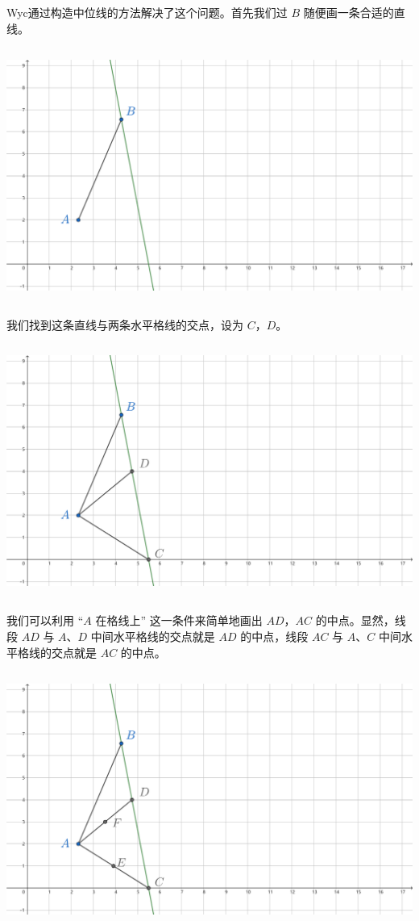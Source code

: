 \documentclass[UTF8]{article}
\begin{document}
Wyc通过构造中位线的方法解决了这个问题。首先我们过 \(B\)
随便画一条合适的直线。

\includegraphics[width=5.76806in,height=3.27847in]{media/image18.png}

我们找到这条直线与两条水平格线的交点，设为 \(C\)，\(D\)。

\includegraphics[width=5.76806in,height=3.27847in]{media/image19.png}

我们可以利用 ``\(A\) 在格线上'' 这一条件来简单地画出 \(AD\)，\(AC\)
的中点。显然，线段 \(AD\) 与 \(A\)、\(D\) 中间水平格线的交点就是 \(AD\)
的中点，线段 \(AC\) 与 \(A\)、\(C\) 中间水平格线的交点就是 \(AC\)
的中点。

\includegraphics[width=5.76806in,height=3.27847in]{media/image20.png}
\end{document}
